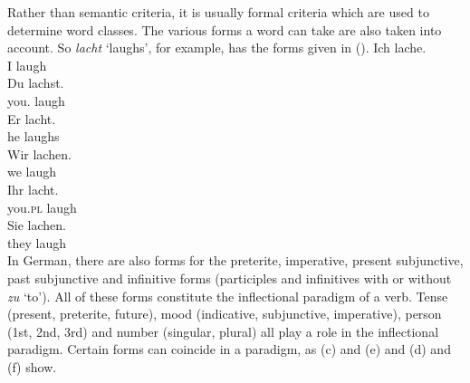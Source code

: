 {Rather than semantic criteria, it is usually formal criteria which are used to determine word classes. The various forms a word can take
are also taken into account. So \emph{lacht} `laughs', for example, has the forms given in (). 
\eal
\ex 
\gll Ich lache.\\
     I laugh\\
\ex 
\gll Du lachst.\\
     you.\sg{} laugh\\
\ex 
\gll Er lacht.\\
     he laughs\\
\ex 
\gll Wir lachen.\\
     we laugh\\
\ex 
\gll Ihr lacht.\\
     you.\textsc{pl} laugh\\
\ex 
\gll Sie lachen.\\
     they laugh\\
\zl
In German, there are also forms for the preterite, imperative, present subjunctive, past subjunctive and infinitive forms 
(participles and infinitives with or without \emph{zu} `to'). All of these forms constitute the
inflectional paradigm of a verb. Tense  (present,
preterite, future),
mood (indicative, subjunctive, imperative),
person (1st, 2nd, 3rd) and number (singular, plural) all play a role in the
inflectional paradigm. Certain forms can coincide in a paradigm, as (c) and (e) and
(d) and (f) show.

}
